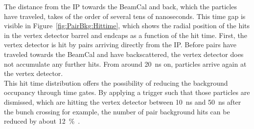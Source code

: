 The distance from the IP towards the BeamCal and back, which the particles have traveled, takes of the order of several tens of nanoseconds.
This time gap is visible in Figure~\ref{fig:PairBkg:Hittime}, which shows the radial position of the hits in the vertex detector barrel and endcaps as a function of the hit time.
First, the vertex detector is hit by \positron\electron pairs arriving directly from the IP.
Before pairs have traveled towards the BeamCal and have backscattered, the vertex detector does not accumulate any further hits.
From around \SI{20}{\nano\second} on, particles arrive again at the vertex detector.
\\This hit time distribution offers the possibility of reducing the background occupancy through time gates.
By applying a trigger such that those particles are dismissed, which are hitting the vertex detector between \SI{10}{\nano\second} and \SI{50}{\nano\second} after the bunch crossing for example, the number of pair background hits can be reduced by about \SI{12}{\percent}~\cite[p. 27]{SiDBkgNote}.
